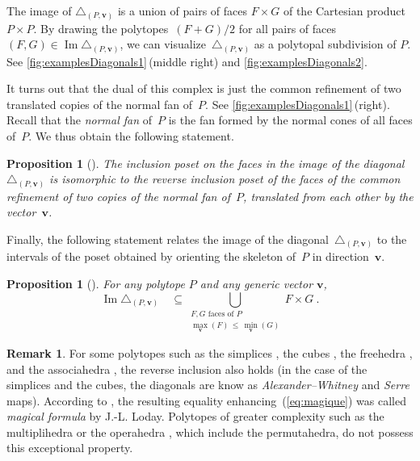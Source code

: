 \documentclass{amsart}
\newcommand{\darkblue}{\color{darkblue}} %
\newtheorem{proposition}[theorem]{Proposition}
\theoremstyle{definition}
\newtheorem{remark}[theorem]{Remark}
\renewcommand{\b}[1]{{\boldsymbol{#1}}} %
\DeclareMathOperator{\Ima}{Im} %
\newcommand{\defn}[1]{\textsl{\darkblue #1}} %
\renewcommand{\b}[1]{\boldsymbol{#1}} %
\begin{document}
The image of $\triangle_{(P,\b{v})}$ is a union of pairs of faces $F \times G$ of the Cartesian product~$P \times P$.
By drawing the polytopes~${(F+G)/2}$ for all pairs of faces $(F,G) \in \Ima \triangle_{(P,\b{v})}$, we can visualize~$\triangle_{(P,\b{v})}$ as a polytopal subdivision of $P$.
See \cref{fig:examplesDiagonals1}\,(middle right) and \cref{fig:examplesDiagonals2}.

It turns out that the dual of this complex is just the common refinement of two translated copies of the normal fan of~$P$.
See \cref{fig:examplesDiagonals1}\,(right).
Recall that the \defn{normal fan} of~$P$ is the fan formed by the normal cones of all faces of~$P$.
We thus obtain the following statement.

\begin{proposition}[{\cite[Coro.~1.4]{LaplanteAnfossi}}]
\label{prop:diagonalCommonRefinement}
The inclusion poset on the faces in the image of the diagonal~$\triangle_{(P,\b{v})}$ is isomorphic to the reverse inclusion poset of the faces of the common refinement of two copies of the normal fan of~$P$, translated from each other by the vector~$\b{v}$. 
\end{proposition}

Finally, the following statement relates the image of the diagonal~$\triangle_{(P, \b{v})}$ to the intervals of the poset obtained by orienting the skeleton of~$P$ in direction~$\b{v}$.

\begin{proposition}[{\cite[Prop. 1.17]{LaplanteAnfossi}}]
\label{prop:magicalFormula}
For any polytope $P$ and any generic vector $\b{v}$,
\begin{equation}
\label{eq:magique}
\Ima\triangle_{(P, \b{v})} \quad \subseteq \bigcup_{\substack{F,G \text{ faces of } P \\ \max_{\b{v}}(F) \, \le \, \min_{\b{v}}(G)}} F \times G \ .
\end{equation}
\end{proposition}

\begin{remark}
For some polytopes such as the simplices \cite{EilenbergMacLane}, the cubes \cite{Serre}, the freehedra \cite{Saneblidze-freeLoopFibration}, and the associahedra \cite{MasudaThomasTonksVallette}, the reverse inclusion also holds (in the case of the simplices and the cubes, the diagonals are know as \emph{Alexander--Whitney} and \emph{Serre} maps).
According to \cite{MasudaThomasTonksVallette}, the resulting equality enhancing~(\ref{eq:magique}) was called \defn{magical formula} by J.-L. Loday.
Polytopes of greater complexity such as the multiplihedra \cite{LaplanteAnfossiMazuir} or the operahedra \cite{LaplanteAnfossi}, which include the permutahedra, do not possess this exceptional property. 
\end{remark}
\end{document}
